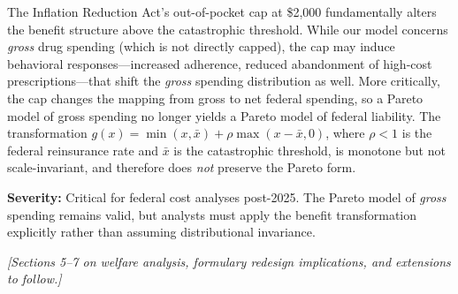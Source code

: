 \documentclass[12pt,letterpaper]{article}
\begin{document}
The Inflation Reduction Act's out-of-pocket cap at \$2,000 fundamentally
alters the benefit structure above the catastrophic threshold. While our
model concerns \emph{gross} drug spending (which is not directly capped), the
cap may induce behavioral responses---increased adherence, reduced
abandonment of high-cost prescriptions---that shift the \emph{gross} spending
distribution as well. More critically, the cap changes the mapping from gross
to net federal spending, so a Pareto model of gross spending no longer yields
a Pareto model of federal liability. The transformation
$g(x) = \min(x, \bar{x}) + \rho \max(x - \bar{x}, 0)$, where $\rho < 1$ is
the federal reinsurance rate and $\bar{x}$ is the catastrophic threshold, is
monotone but not scale-invariant, and therefore does \emph{not} preserve the
Pareto form.

\textbf{Severity:} Critical for federal cost analyses post-2025. The Pareto
model of \emph{gross} spending remains valid, but analysts must apply the
benefit transformation explicitly rather than assuming distributional
invariance.

\bigskip

\noindent\textit{[Sections 5--7 on welfare analysis, formulary redesign
implications, and extensions to follow.]}


\end{document}
